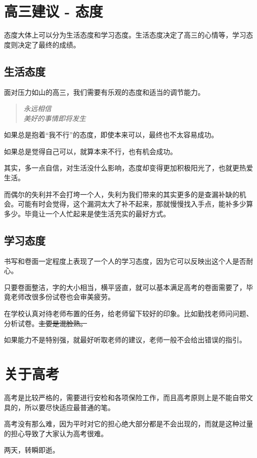 \documentclass[UTF8,11pt,a4paper]{ctexart}
\begin{document}
	\section{高三建议 - 态度}%
		态度大体上可以分为生活态度和学习态度。生活态度决定了高三的心情等，学习态度则决定了最终的成绩。
		\subsection{生活态度}
			面对压力如山的高三，我们需要有乐观的态度和适当的调节能力。
			
			\begin{quote}
				\it 永远相信\\
				美好的事情即将发生\\
			\end{quote}
		
			如果总是抱着“我不行”的态度，即使本来可以，最终也不太容易成功。
			
			如果总是觉得自己可以，就算本来不行，也有机会成功。
			
			其实，多一点自信，对生活没什么影响，态度却变得更加积极阳光了，也就更热爱生活。
			
			而偶尔的失利并不会打垮一个人，失利为我们带来的其实更多的是查漏补缺的机会。可能有时会觉得，这个漏洞太大了补不起来，那就慢慢找入手点，能补多少算多少。毕竟让一个人忙起来是使生活充实的最好方式。
		\subsection{学习态度}
			书写和卷面一定程度上表现了一个人的学习态度，因为它可以反映出这个人是否耐心。
			
			只要卷面整洁，字的大小相当，横平竖直，就可以基本满足高考的卷面需要了，毕竟老师改很多份试卷也会审美疲劳。
			
			在学校认真对待老师布置的任务，给老师留下较好的印象。比如勤找老师问问题、分析试卷。\sout{主要是混脸熟。}
			
			如果能力不是特别强，就最好听取老师的建议，老师一般不会给出错误的指引。
	\section{关于高考}
		高考是比较严格的，需要进行安检和各项保险工作，而且高考原则上是不能自带文具的，所以要尽快适应最普通的笔。
		
		高考没有那么难，因为平时对它的担心绝大部分都是不会出现的，而就是这种过量的担心导致了大家认为高考很难。
		
		两天，转瞬即逝。
			
\end{document}

